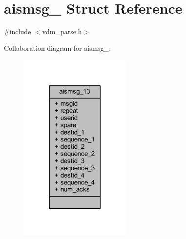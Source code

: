 \hypertarget{structaismsg__13}{}\section{aismsg\+\_ Struct Reference}
\label{structaismsg__13}


{\ttfamily \#include $<$vdm\+\_\+parse.\+h$>$}



Collaboration diagram for aismsg\+\_\+:
\nopagebreak
\begin{figure}[H]
\begin{center}
\leavevmode
\includegraphics[width=158pt]{structaismsg__13__coll__graph}
\end{center}
\end{figure}
